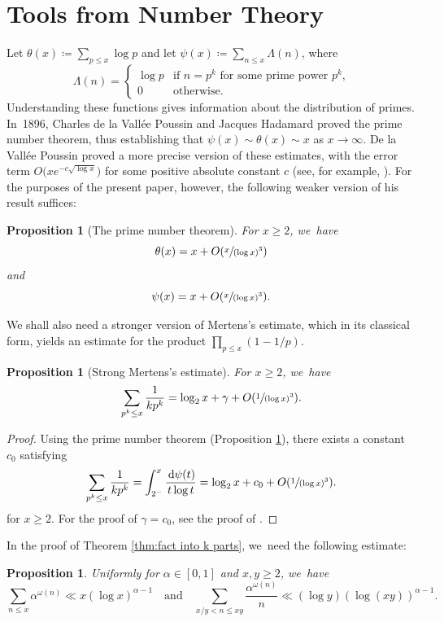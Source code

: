 \documentclass[JEP,XML,SOM,Unicode,published]{cedram}
\newcommand{\bigO}[1]{O(#1)}
\newcommand{\dee}{\,\mathrm{d}}
\newcommand{\bg}{\big}
\theoremstyle{plain}
\newtheorem{prop}[cor]{Proposition}
\theoremstyle{definition}
\begin{document}
\section{Tools from Number Theory}
\label{sec:prel}

Let $\theta(x) \coloneqq \sum_{p \le x} \log p$ and let $\psi(x) \coloneqq \sum_{n \le x} \Lambda(n)$, where
\[
\Lambda(n) = \begin{cases}
\log p &\text{if $n = p^k$ for some prime power $p^k$,} \\
0 &\text{otherwise.}
\end{cases}
\]
Understanding these functions gives information about the distribution of primes. In~1896, Charles de la Vallée Poussin and Jacques Hadamard proved the prime number theorem, thus establishing that $\psi(x)\sim\theta(x)\sim x$ as $x\to\infty$. De la Vallée Poussin proved a more precise version of these estimates, with the error term $O\bg(xe^{-c\sqrt{\log x}}\bg)$ for some positive absolute constant $c$ (see, for example, \cite[Ch.\,8]{Koukoulo19}). For the purposes of the present paper, however, the following weaker version of his result suffices:

\begin{prop}[The prime number theorem]
\label{pnt}
For $x \ge 2$, we~have
\[
\theta(x) = x + \bigO{\sfrac{x}{(\log x)^3}}
\]
and
\[
\psi(x) = x+\bigO{\sfrac{x}{(\log x)^3}}.
\]
\end{prop}

We shall also need a stronger version of Mertens's estimate, which in its classical form, yields an estimate for the product $\prod_{p \le x} (1-1/p)$.

\begin{prop}[Strong Mertens's estimate]
\label{prop:mertens}
For $x \ge 2$, we~have
\[
\sum_{p^k \le x} \frac{1}{kp^k} = \log_2 x + \gamma + \bigO{\sfrac{1}{(\log x)^3}}.
\]
\end{prop}

\begin{proof}
Using the prime number theorem (Proposition \ref{pnt}), there exists a constant $c_0$ satisfying
\[
\sum_{p^k \le x} \frac{1}{kp^k} = \int_{2^-}^x \frac{\dee \psi(t)}{t\log t} = \log_2 x + c_0 + \bigO{\sfrac{1}{(\log x)^3}}.
\]
for $x \ge 2$. For the proof of $\gamma = c_0$, see the proof of \cite[Th.\,2.7]{MV07}.
\end{proof}

In the proof of Theorem \ref{thm:fact into k parts}, we~need the following estimate:
\begin{prop}
\label{prel:partial summation bounds}
Uniformly for $\alpha\in[0,1]$ and $x,y\ge2$, we~have
\[
\sum_{n \le x} \alpha^{\omega(n)} \ll x(\log x)^{\alpha-1}
\quad \text{and} \quad \sum_{x/y<n \le xy} \frac{ \alpha^{\omega(n)}}{n} \ll (\log y)(\log(xy))^{\alpha-1}.
\]
\end{prop}
\end{document}
